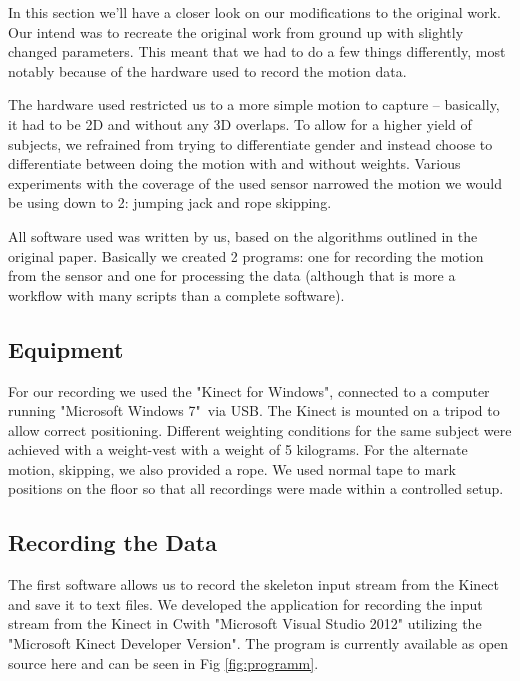\documentclass[a4paper]{article}
\newcommand{\CS}{C\nolinebreak\hspace{-.05em}\raisebox{.6ex}{\scriptsize\bf \#\ }}
\begin{document}
In this section we'll have a closer look on our modifications to the original work.
Our intend was to recreate the original work from ground up with slightly changed parameters.
This meant that we had to do a few things differently, most notably because of the hardware used to record the motion data.

The hardware used restricted us to a more simple motion to capture – basically, it had to be 2D and without any 3D overlaps.
To allow for a higher yield of subjects, we refrained from trying to differentiate gender and instead choose to differentiate between doing the motion with and without weights.
Various experiments with the coverage of the used sensor narrowed the motion we would be using down to 2: jumping jack and rope skipping.

All software used was written by us, based on the algorithms outlined in the original paper.
Basically we created 2 programs: one for recording the motion from the sensor and one for processing the data (although that is more a workflow with many scripts than a complete software).

\subsection{Equipment}

For our recording we used the "Kinect for Windows"\texttrademark \cite{kinect}, connected to a computer running "Microsoft Windows 7"\textregistered \ via USB.
The Kinect is mounted on a tripod to allow correct positioning.
Different weighting conditions for the same subject were achieved with a weight-vest with a weight of 5 kilograms.
For the alternate motion, skipping, we also provided a rope.
We used normal tape to mark positions on the floor so that all recordings were made within a controlled setup.

\subsection{Recording the Data}

The first software allows us to record the skeleton input stream from the Kinect and save it to text files.
We developed the application for recording the input stream from the Kinect in \CS with "Microsoft Visual Studio 2012" utilizing the "Microsoft Kinect Developer Version".
The program is currently available as open source here \cite{csprogram} and can be seen in Fig \ref{fig:programm}.
\end{document}

